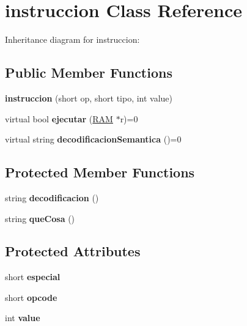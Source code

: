 \hypertarget{classinstruccion}{}\section{instruccion Class Reference}
\label{classinstruccion}


Inheritance diagram for instruccion\+:
\subsection*{Public Member Functions}
\begin{DoxyCompactItemize}
\item 
\hypertarget{classinstruccion_afc6ab76378c24cf97840598250a0b3fc}{}{\bfseries instruccion} (short op, short tipo, int value)\label{classinstruccion_afc6ab76378c24cf97840598250a0b3fc}

\item 
\hypertarget{classinstruccion_a91a47d3d68acf29036f70bc434d39c33}{}virtual bool {\bfseries ejecutar} (\hyperlink{classRAM}{R\+A\+M} $\ast$r)=0\label{classinstruccion_a91a47d3d68acf29036f70bc434d39c33}

\item 
\hypertarget{classinstruccion_aa777f65af562299f0ac337f0015b9ef0}{}virtual string {\bfseries decodificacion\+Semantica} ()=0\label{classinstruccion_aa777f65af562299f0ac337f0015b9ef0}

\end{DoxyCompactItemize}
\subsection*{Protected Member Functions}
\begin{DoxyCompactItemize}
\item 
\hypertarget{classinstruccion_a1c0eb11f84e25c2f3747eba9871cbe13}{}string {\bfseries decodificacion} ()\label{classinstruccion_a1c0eb11f84e25c2f3747eba9871cbe13}

\item 
\hypertarget{classinstruccion_a759f401136c040cd79603de2cedcd19c}{}string {\bfseries que\+Cosa} ()\label{classinstruccion_a759f401136c040cd79603de2cedcd19c}

\end{DoxyCompactItemize}
\subsection*{Protected Attributes}
\begin{DoxyCompactItemize}
\item 
\hypertarget{classinstruccion_a570209ac8427e067b5dc5b9c3d5a7dd9}{}short {\bfseries especial}\label{classinstruccion_a570209ac8427e067b5dc5b9c3d5a7dd9}

\item 
\hypertarget{classinstruccion_ae25040702a56a88f76988c403be5adc4}{}short {\bfseries opcode}\label{classinstruccion_ae25040702a56a88f76988c403be5adc4}

\item 
\hypertarget{classinstruccion_a65aaf6877f6085bcfa8f31f5a96460f1}{}int {\bfseries value}\label{classinstruccion_a65aaf6877f6085bcfa8f31f5a96460f1}

\end{DoxyCompactItemize}

